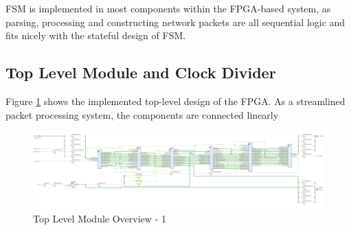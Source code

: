 \documentclass[a4paper]{report}
\begin{document}
FSM is implemented in most components within the FPGA-based system, as parsing, processing and constructing network packets are all sequential logic and fits nicely with the stateful design of FSM.

\subsection{Top Level Module and Clock Divider}

Figure \ref{fig:top-level-design} shows the implemented top-level design of the FPGA. As a streamlined packet processing system, the components are connected linearly 

\begin{figure}
  \centering
  \includegraphics*[viewport={0 0 950 600}, width=0.95\textheight, height=\textwidth, keepaspectratio, angle=270]{imgs/top-level-module.png}
  \caption{Top Level Module Overview - 1}
  \label{fig:top-level-design}
\end{figure}
\end{document}

